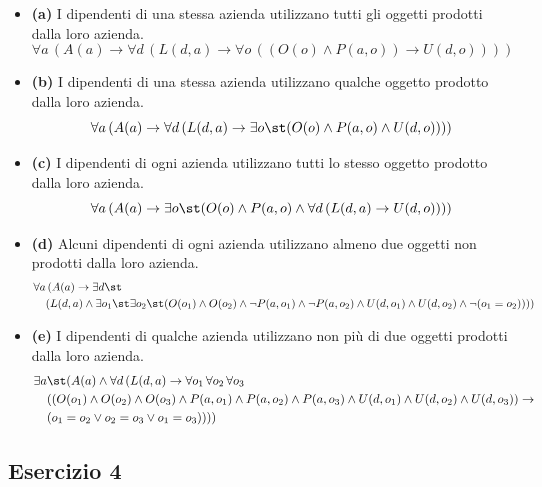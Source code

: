 \begin{itemize}
  \item \textbf{(a)} I dipendenti di una stessa azienda utilizzano tutti gli oggetti prodotti dalla loro azienda.
  \[\forall a\, (A(a) \rightarrow \forall d\, (L(d, a) \rightarrow \forall o\, ((O(o) \land P(a, o)) \rightarrow U(d, o))))\]

  \item \textbf{(b)} I dipendenti di una stessa azienda utilizzano qualche oggetto prodotto dalla loro azienda.
  \[\forall a\, (A(a) \rightarrow \forall d\, (L(d, a) \rightarrow \exists o\st (O(o) \land P(a, o) \land U(d, o))))\]

  \item \textbf{(c)} I dipendenti di ogni azienda utilizzano tutti lo stesso oggetto prodotto dalla loro azienda.
  \[\forall a\, (A(a) \rightarrow \exists o\st (O(o) \land P(a, o) \land \forall d\, (L(d, a) \rightarrow U(d, o))))\]

  \item \textbf{(d)} Alcuni dipendenti di ogni azienda utilizzano almeno due oggetti non prodotti dalla loro azienda.
  \[
  \begin{aligned}
    \forall a&\, (A(a) \rightarrow \exists d\st\\
                      &(L(d, a) \land \exists o_1\st \exists o_2\st (O(o_1) \land O(o_2) \land \neg P(a, o_1) \land \neg P(a, o_2) \land U(d, o_1) \land U(d, o_2) \land \neg(o_1 = o_2))))
  \end{aligned}
  \]
  \item \textbf{(e)} I dipendenti di qualche azienda utilizzano non più di due oggetti prodotti dalla loro azienda.
  \[
  \begin{aligned}
    \exists a&\st (A(a) \land \forall d\, (L(d, a) \rightarrow \forall o_1\, \forall o_2\, \forall o_3\, \\
    &((O(o_1) \land O(o_2) \land O(o_3) \land P(a, o_1) \land P(a, o_2) \land P(a, o_3) \land U(d, o_1) \land U(d, o_2) \land U(d, o_3)) \rightarrow\\
    & (o_1 = o_2 \lor o_2 = o_3 \lor o_1 = o_3))))
  \end{aligned}
  \]
\end{itemize}



\subsection*{Esercizio 4}

